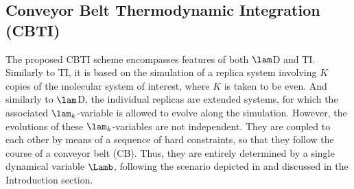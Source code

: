 \subsection{Conveyor Belt Thermodynamic Integration (CBTI)}


The proposed CBTI scheme encompasses features of both $\lam$D and TI.
%
Similarly to TI, it is based on the simulation of a replica system involving 
$K$ copies of the molecular system of interest, where $K$ is taken to be even.
%
And similarly to $\lam$D, the individual replicas are extended 
systems, for which the associated $\lam_k$-variable is allowed to evolve
along the simulation.
%
However, the evolutions of these $\lam_k$-variables are not independent. 
They are coupled to each 
other by means of a sequence of hard constraints,
 so that they follow the course of a conveyor belt (CB).
Thus, they are entirely determined by a single dynamical
variable $\Lamb$, following 
the scenario depicted in  and discussed
in the Introduction section.



